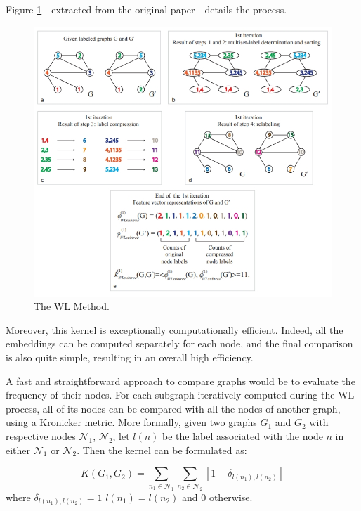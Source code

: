 \documentclass{IEEEtran}
\begin{document}
Figure \ref{fig:wlmethod} - extracted from the original paper - details the process.

\begin{figure}[h]
    \centering
    \includegraphics[width=\linewidth]{wl_process.jpg}
    \caption{The WL Method.}
    \label{fig:wlmethod}
\end{figure}

Moreover, this kernel is exceptionally computationally efficient. Indeed, all the embeddings can be computed separately for each node, and the final comparison is also quite simple, resulting in an overall high efficiency.

A fast and straightforward approach to compare graphs would be to evaluate the frequency of their nodes.
For each subgraph iteratively computed during the WL process,
all of its nodes can be compared with all the nodes of another graph,
using a Kronicker metric.
More formally, given two graphs $G_1$ and $G_2$
with respective nodes $\mathcal{N}_1$, $\mathcal{N}_2$, let $l(n)$
be the label associated with the node $n$ in either $\mathcal{N}_1$ or $\mathcal{N}_2$.
Then the kernel can be formulated as:

\begin{equation*}
    K(G_1, G_2) = \sum_{n_1 \in \mathcal{N}_1} \sum_{n_2 \in \mathcal{N}_2} [1 - \delta_{l(n_1), l(n_2)}]
\end{equation*}
where $\delta_{l(n_1), l(n_2)} = 1$  $l(n_1) = l(n_2)$ and $0$ otherwise.
\end{document}
